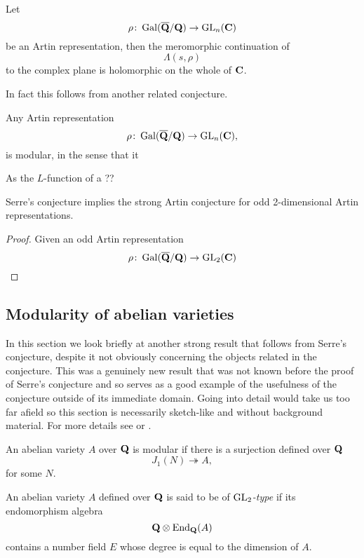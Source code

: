 \documentclass[a4paper,12pt]{article}
\begin{document}
\begin{conjecture}
Let
\[
\rho\colon \operatorname{Gal}(\overline{\mathbf{Q}}/\mathbf{Q}) \to \operatorname{GL}_n(\mathbf{C})
\]
be an Artin representation, then the meromorphic continuation of
\[
\Lambda(s,\rho)
\]
to the complex plane is holomorphic on the whole of $\mathbf{C}$.
\end{conjecture}

In fact this follows from another related conjecture.

\begin{conjecture}
Any Artin representation
\[
\rho\colon \operatorname{Gal}(\overline{\mathbf{Q}}/\mathbf{Q}) \to \operatorname{GL}_n(\mathbf{C}),
\]
is modular, in the sense that it
\end{conjecture}

As the $L$-function of a ??

\begin{prop}
Serre's conjecture implies the strong Artin conjecture for odd 2-dimensional Artin representations.
\end{prop}
\begin{proof}
Given an odd Artin representation
\[
\rho\colon \operatorname{Gal}(\overline{\mathbf{Q}}/\mathbf{Q})\to \operatorname{GL}_2(\mathbf{C})
\]

\end{proof}


\subsection{Modularity of abelian varieties}
In this section we look briefly at another strong result that follows from Serre's conjecture, despite it not obviously concerning the objects related in the conjecture.
This was a genuinely new result that was not known before the proof of Serre's conjecture and so serves as a good example of the usefulness of the conjecture outside of its immediate domain.
Going into detail would take us too far afield so this section is necessarily sketch-like and without background material.
For more details see \cite{Ribet04} or \cite[chap. 15]{RibetSteinBook}.

\begin{defn}
An abelian variety $A$ over $\mathbf{Q}$ is modular if there is a surjection defined over $\mathbf{Q}$
\[
J_1(N) \twoheadrightarrow A,
\]
for some $N$.
\end{defn}

\begin{defn}
An abelian variety $A$ defined over $\mathbf{Q}$ is said to be of \emph{$\operatorname{GL}_2$-type} if its endomorphism algebra
\[
\mathbf{Q}\otimes \operatorname{End}_{\mathbf{Q}}(A)
\]
contains a number field $E$ whose degree is equal to the dimension of $A$.
\end{defn}
\end{document}
